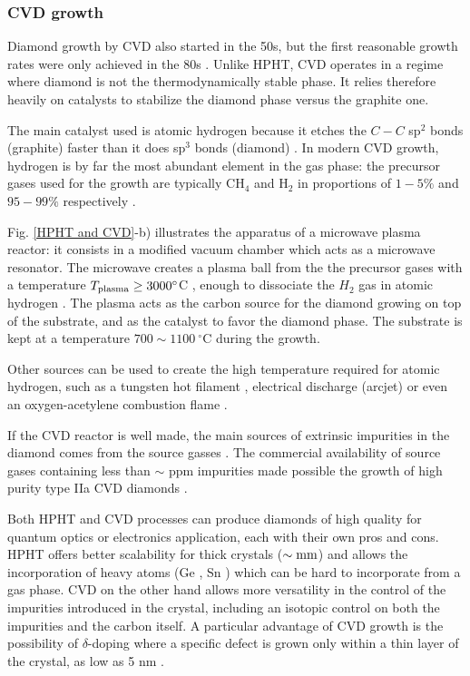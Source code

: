 \documentclass[a4paper, 11pt]{book}
\begin{document}
\subsubsection{CVD growth}
\label{fab HPHT}

Diamond growth by CVD also started in the 50s, but the first reasonable growth rates were only achieved in the 80s \citep{matsumoto1982growth, matsumoto1982vapor, kamo1983diamond}. Unlike HPHT, CVD operates in a regime where diamond is not the thermodynamically stable phase. It relies therefore heavily on catalysts to stabilize the diamond phase versus the graphite one. 

The main catalyst used is atomic hydrogen because it etches the $C-C$ sp$^2$ bonds (graphite) faster than it does sp$^3$ bonds (diamond) \citep{gracio2010diamond}. In modern CVD growth, hydrogen is by far the most abundant element in the gas phase: the precursor gases used for the growth are typically CH$_4$ and H$_2$ in proportions of $1-5\%$ and $95-99\%$ respectively \citep{achard2020chemical}.

Fig. \ref{HPHT and CVD}-b) illustrates the apparatus of a microwave plasma reactor: it consists in a modified vacuum chamber which acts as a microwave resonator. The microwave creates a plasma ball from the the precursor gases with a temperature $T_{\rm plasma} \geq 3000 ^\circ$C \citep{ashfold2020nitrogen}, enough to dissociate the $H_2$ gas in atomic hydrogen \citep{balmer2009chemical}. The plasma acts as the carbon source for the diamond growing on top of the substrate, and as the catalyst to favor the diamond phase. The substrate is kept at a temperature $700 \sim 1100\ ^\circ$C during the growth.

Other sources can be used to create the high temperature required for atomic hydrogen, such as a tungsten hot filament \citep{haubner1993diamond}, electrical discharge (arcjet) \citep{luque1998excited} or even an oxygen-acetylene combustion flame \citep{bachmann1991towards}.

If the CVD reactor is well made, the main sources of extrinsic impurities in the diamond comes from the source gasses \citep{balmer2009chemical}. The commercial availability of source gases containing less than $\sim$ ppm impurities made possible the growth of  high purity type IIa CVD diamonds \citep{kasu2003high, twitchen2004high, tallaire2006characterisation}.

\medskip
Both HPHT and CVD processes can produce diamonds of high quality for quantum optics or electronics application, each with their own pros and cons. HPHT offers better scalability for thick crystals ($\sim \rm mm$) and allows the incorporation of heavy atoms (Ge \citep{palyanov2015germanium} , Sn \citep{ekimov2019effect}) which can be hard to incorporate from a gas phase. CVD on the other hand allows more versatility in the control of the impurities introduced in the crystal, including an isotopic control on both the impurities and the carbon itself. A particular advantage of CVD growth is the possibility of $\delta$-doping where a specific defect is grown only within a thin layer of the crystal, as low as 5 nm \citep{ohno2012engineering, ishikawa2012optical, ohashi2013negatively}.
\end{document}
